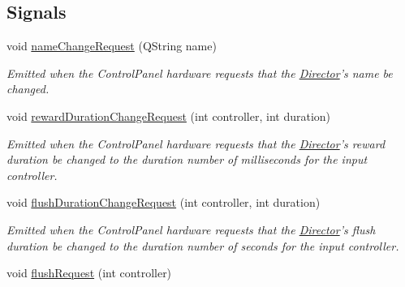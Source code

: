 \subsection*{Signals}
\begin{DoxyCompactItemize}
\item 
\hypertarget{class_control_panel_interface_a8251e17c19a1c3a51b416e586e224dec}{void \hyperlink{class_control_panel_interface_a8251e17c19a1c3a51b416e586e224dec}{name\-Change\-Request} (Q\-String name)}\label{class_control_panel_interface_a8251e17c19a1c3a51b416e586e224dec}

\begin{DoxyCompactList}\small\item\em Emitted when the Control\-Panel hardware requests that the \hyperlink{class_director}{Director}'s name be changed. \end{DoxyCompactList}\item 
\hypertarget{class_control_panel_interface_ab8113b70c74a95efedac338f61fa1017}{void \hyperlink{class_control_panel_interface_ab8113b70c74a95efedac338f61fa1017}{reward\-Duration\-Change\-Request} (int controller, int duration)}\label{class_control_panel_interface_ab8113b70c74a95efedac338f61fa1017}

\begin{DoxyCompactList}\small\item\em Emitted when the Control\-Panel hardware requests that the \hyperlink{class_director}{Director}'s reward duration be changed to the duration number of milliseconds for the input controller. \end{DoxyCompactList}\item 
\hypertarget{class_control_panel_interface_ae101f565590fac484e9b17ef12394b4d}{void \hyperlink{class_control_panel_interface_ae101f565590fac484e9b17ef12394b4d}{flush\-Duration\-Change\-Request} (int controller, int duration)}\label{class_control_panel_interface_ae101f565590fac484e9b17ef12394b4d}

\begin{DoxyCompactList}\small\item\em Emitted when the Control\-Panel hardware requests that the \hyperlink{class_director}{Director}'s flush duration be changed to the duration number of seconds for the input controller. \end{DoxyCompactList}\item 
\hypertarget{class_control_panel_interface_a20654c5b491cc616fb452ca8956bb63a}{void \hyperlink{class_control_panel_interface_a20654c5b491cc616fb452ca8956bb63a}{flush\-Request} (int controller)}\label{class_control_panel_interface_a20654c5b491cc616fb452ca8956bb63a}


\end{DoxyCompactItemize}
